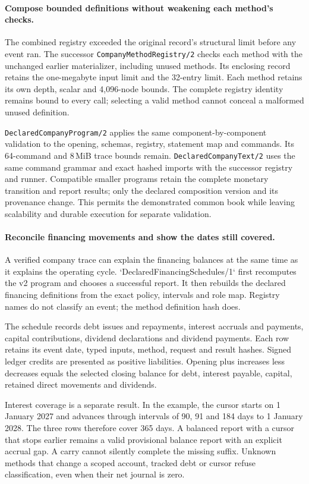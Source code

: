 \paragraph{Compose bounded definitions without weakening each method's checks.}
The combined registry exceeded the original record's structural limit before any
event ran. The successor \texttt{CompanyMethodRegistry/2} checks each method with
the unchanged earlier materializer, including unused methods. Its enclosing
record retains the one-megabyte input limit and the 32-entry limit. Each method
retains its own depth, scalar and 4,096-node bounds. The complete registry identity
remains bound to every call; selecting a valid method cannot conceal a malformed
unused definition.

\texttt{DeclaredCompanyProgram/2} applies the same component-by-component validation
to the opening, schemas, registry, statement map and commands. Its 64-command and
8\,MiB trace bounds remain. \texttt{DeclaredCompanyText/2} uses the same command
grammar and exact hashed imports with the successor registry and runner.
Compatible smaller programs retain the complete monetary transition and report
results; only the declared composition version and its provenance change.
This permits the demonstrated common book while leaving scalability and durable
execution for separate validation.


\paragraph{Reconcile financing movements and show the dates still covered.}
A verified company trace can explain the financing balances at the same time as it explains the operating cycle. `DeclaredFinancingSchedules/1` first recomputes the v2 program and chooses a successful report. It then rebuilds the declared financing definitions from the exact policy, intervals and role map. Registry names do not classify an event; the method definition hash does.

The schedule records debt issues and repayments, interest accruals and payments, capital contributions, dividend declarations and dividend payments. Each row retains its event date, typed inputs, method, request and result hashes. Signed ledger credits are presented as positive liabilities. Opening plus increases less decreases equals the selected closing balance for debt, interest payable, capital, retained direct movements and dividends.

Interest coverage is a separate result. In the example, the cursor starts on 1 January 2027 and advances through intervals of 90, 91 and 184 days to 1 January 2028. The three rows therefore cover 365 days. A balanced report with a cursor that stops earlier remains a valid provisional balance report with an explicit accrual gap. A carry cannot silently complete the missing suffix. Unknown methods that change a scoped account, tracked debt or cursor refuse classification, even when their net journal is zero.

